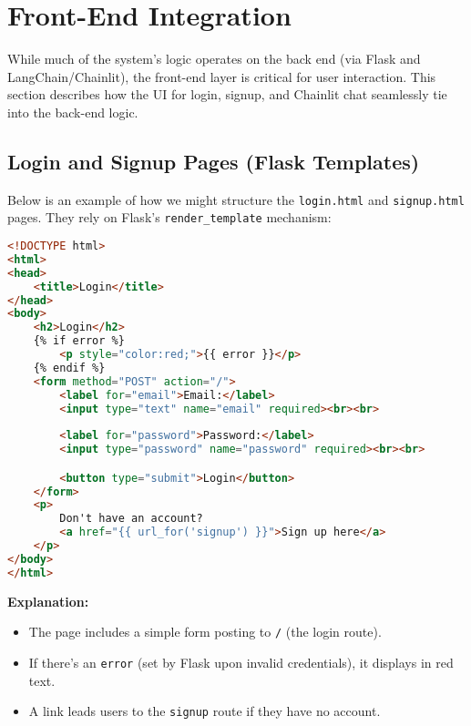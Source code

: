 \section{Front-End Integration}
\label{sec:frontend}

While much of the system’s logic operates on the back end (via Flask and LangChain/Chainlit), the front-end layer is critical for user interaction. This section describes how the UI for login, signup, and Chainlit chat seamlessly tie into the back-end logic.

\subsection{Login and Signup Pages (Flask Templates)}

Below is an example of how we might structure the \texttt{login.html} and \texttt{signup.html} pages. They rely on Flask’s \texttt{render\_template} mechanism:

\begin{lstlisting}[language=HTML, caption={login.html (Flask Template)}, basicstyle=\small\ttfamily]
<!DOCTYPE html>
<html>
<head>
    <title>Login</title>
</head>
<body>
    <h2>Login</h2>
    {% if error %}
        <p style="color:red;">{{ error }}</p>
    {% endif %}
    <form method="POST" action="/">
        <label for="email">Email:</label>
        <input type="text" name="email" required><br><br>
        
        <label for="password">Password:</label>
        <input type="password" name="password" required><br><br>

        <button type="submit">Login</button>
    </form>
    <p>
        Don't have an account? 
        <a href="{{ url_for('signup') }}">Sign up here</a>
    </p>
</body>
</html>
\end{lstlisting}

\noindent\textbf{Explanation:}
\begin{itemize}
    \item The page includes a simple form posting to \texttt{/} (the login route).
    \item If there’s an \texttt{error} (set by Flask upon invalid credentials), it displays in red text.
    \item A link leads users to the \texttt{signup} route if they have no account.
\end{itemize}

